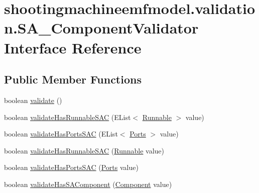 \hypertarget{interfaceshootingmachineemfmodel_1_1validation_1_1_s_a___component_validator}{\section{shootingmachineemfmodel.\-validation.\-S\-A\-\_\-\-Component\-Validator Interface Reference}
\label{interfaceshootingmachineemfmodel_1_1validation_1_1_s_a___component_validator}
}
\subsection*{Public Member Functions}
\begin{DoxyCompactItemize}
\item 
boolean \hyperlink{interfaceshootingmachineemfmodel_1_1validation_1_1_s_a___component_validator_ae2de3d0ecd1f5199eece3ebc48da270c}{validate} ()
\item 
boolean \hyperlink{interfaceshootingmachineemfmodel_1_1validation_1_1_s_a___component_validator_a17ba0e09c2ce62b83d46f0959a3effeb}{validate\-Has\-Runnable\-S\-A\-C} (E\-List$<$ \hyperlink{interfaceshootingmachineemfmodel_1_1_runnable}{Runnable} $>$ value)
\item 
boolean \hyperlink{interfaceshootingmachineemfmodel_1_1validation_1_1_s_a___component_validator_acc8c37d5ab5c6b8ce49623a37f0fd6ff}{validate\-Has\-Ports\-S\-A\-C} (E\-List$<$ \hyperlink{interfaceshootingmachineemfmodel_1_1_ports}{Ports} $>$ value)
\item 
boolean \hyperlink{interfaceshootingmachineemfmodel_1_1validation_1_1_s_a___component_validator_a49f2fc4c9b08296c160e345ff47b4b13}{validate\-Has\-Runnable\-S\-A\-C} (\hyperlink{interfaceshootingmachineemfmodel_1_1_runnable}{Runnable} value)
\item 
boolean \hyperlink{interfaceshootingmachineemfmodel_1_1validation_1_1_s_a___component_validator_a350115ffffb7d1cc236559de1fe281e4}{validate\-Has\-Ports\-S\-A\-C} (\hyperlink{interfaceshootingmachineemfmodel_1_1_ports}{Ports} value)
\item 
boolean \hyperlink{interfaceshootingmachineemfmodel_1_1validation_1_1_s_a___component_validator_aae120013446647454e6931e754b78805}{validate\-Has\-S\-A\-Component} (\hyperlink{interfaceshootingmachineemfmodel_1_1_component}{Component} value)
\end{DoxyCompactItemize}


